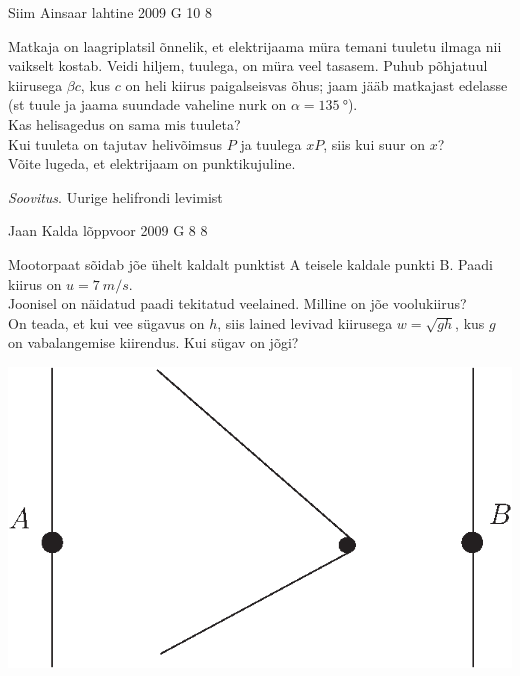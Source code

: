 \documentclass[11pt, twoside]{article}
\begin{document}
{%
{Siim Ainsaar} %
{lahtine} %
{2009} %
{G 10} %
{8} %
{
\ifStatement
Matkaja on laagriplatsil õnnelik, et elektrijaama müra temani tuuletu ilmaga nii vaikselt kostab. Veidi hiljem, tuulega, on müra veel tasasem. Puhub põhjatuul kiirusega $\beta c$, kus $c$ on heli kiirus paigalseisvas õhus; jaam jääb matkajast edelasse
(st tuule ja jaama suundade vaheline nurk on $\alpha = \SI{135}{\degree}$).\\
\osa Kas helisagedus on sama mis tuuleta?\\
\osa Kui tuuleta on tajutav helivõimsus $P$ ja tuulega $xP$, siis kui suur on $x$?\\
Võite lugeda, et elektrijaam on punktikujuline. 

\emph{Soovitus}. Uurige helifrondi levimist
\fi
}

{Jaan Kalda} %
{lõppvoor} %
{2009} %
{G 8} %
{8} %
{
\ifStatement
Mootorpaat sõidab jõe ühelt kaldalt punktist A teisele kaldale punkti B. Paadi kiirus on $u=\SI{7}{m/s}$.\\
\osa Joonisel on näidatud paadi tekitatud veelained. Milline on jõe voolukiirus?\\
\osa On teada, et kui vee sügavus on $h$, siis lained levivad kiirusega $w=\sqrt{gh}$, kus $g$ on vabalangemise kiirendus.
Kui sügav on jõgi?

\begin{center}
\includegraphics[width=0.55\linewidth]{2009-v3g-08-paat.eps}
\end{center}
\fi
}

}
\end{document}
